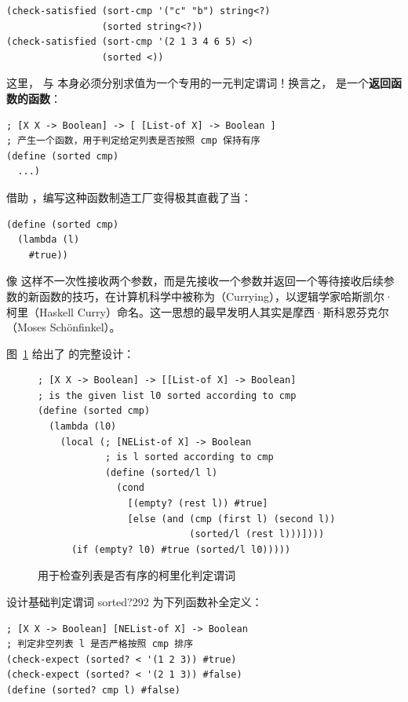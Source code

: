 \begin{lstlisting}[language=BSL]
(check-satisfied (sort-cmp '("c" "b") string<?)
                 (sorted string<?))
(check-satisfied (sort-cmp '(2 1 3 4 6 5) <)
                 (sorted <))
\end{lstlisting}

这里， 与  本身必须分别求值为一个专用的一元判定谓词！换言之， 是一个\textbf{返回函数的函数}：

\begin{lstlisting}[language=BSL]
; [X X -> Boolean] -> [ [List-of X] -> Boolean ]
; 产生一个函数，用于判定给定列表是否按照 cmp 保持有序
(define (sorted cmp)
  ...)
\end{lstlisting}

借助 ，编写这种函数制造工厂变得极其直截了当：

\begin{lstlisting}[language=BSL]
(define (sorted cmp)
  (lambda (l)
    #true))
\end{lstlisting}

\begin{notebox}[柯里化与斯科恩芬克尔]
像  这样不一次性接收两个参数，而是先接收一个参数并返回一个等待接收后续参数的新函数的技巧，在计算机科学中被称为（Currying），以逻辑学家哈斯凯尔·柯里（Haskell Curry）命名。这一思想的最早发明人其实是摩西·斯科恩芬克尔（Moses Schönfinkel）。
\end{notebox}

图~\ref{fig:104} 给出了  的完整设计：

\begin{figure}[htbp]
  \centering
\begin{lstlisting}[language=BSL]
; [X X -> Boolean] -> [[List-of X] -> Boolean]
; is the given list l0 sorted according to cmp
(define (sorted cmp)
  (lambda (l0)
    (local (; [NEList-of X] -> Boolean
            ; is l sorted according to cmp
            (define (sorted/l l)
              (cond
                [(empty? (rest l)) #true]
                [else (and (cmp (first l) (second l))
                           (sorted/l (rest l)))])))
      (if (empty? l0) #true (sorted/l l0)))))
\end{lstlisting}
  \caption{用于检查列表是否有序的柯里化判定谓词}
  \label{fig:104}
\end{figure}

\begin{exercise}{设计基础判定谓词 sorted?}{292}
为下列函数补全定义：
\begin{lstlisting}[language=BSL]
; [X X -> Boolean] [NEList-of X] -> Boolean
; 判定非空列表 l 是否严格按照 cmp 排序
(check-expect (sorted? < '(1 2 3)) #true)
(check-expect (sorted? < '(2 1 3)) #false)
(define (sorted? cmp l) #false)
\end{lstlisting}
\end{exercise}

